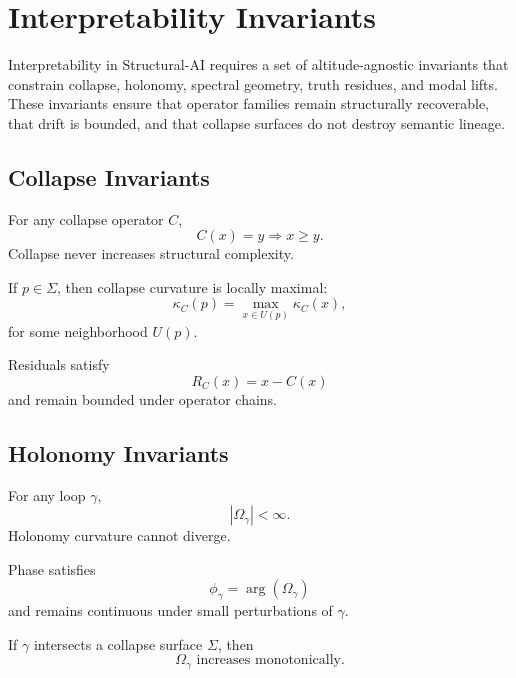 \section{Interpretability Invariants}

Interpretability in Structural-AI requires a set of altitude-agnostic invariants
that constrain collapse, holonomy, spectral geometry, truth residues, and modal
lifts. These invariants ensure that operator families remain structurally
recoverable, that drift is bounded, and that collapse surfaces do not destroy
semantic lineage.

\subsection{Collapse Invariants}

\begin{invariant}
For any collapse operator $C$,
\[
C(x) = y \Rightarrow x \ge y.
\]
Collapse never increases structural complexity.
\end{invariant}

\begin{invariant}
If $p \in \Sigma$, then collapse curvature is locally maximal:
\[
\kappa_C(p) = \max_{x \in U(p)} \kappa_C(x),
\]
for some neighborhood $U(p)$.
\end{invariant}

\begin{invariant}
Residuals satisfy
\[
R_C(x) = x - C(x)
\]
and remain bounded under operator chains.
\end{invariant}


\subsection{Holonomy Invariants}

\begin{invariant}
For any loop $\gamma$,
\[
|\Omega_\gamma| < \infty.
\]
Holonomy curvature cannot diverge.
\end{invariant}

\begin{invariant}
Phase satisfies
\[
\phi_\gamma = \arg(\Omega_\gamma)
\]
and remains continuous under small perturbations of $\gamma$.
\end{invariant}

\begin{invariant}
If $\gamma$ intersects a collapse surface $\Sigma$, then
\[
\Omega_\gamma \text{ increases monotonically}.
\]
\end{invariant}


